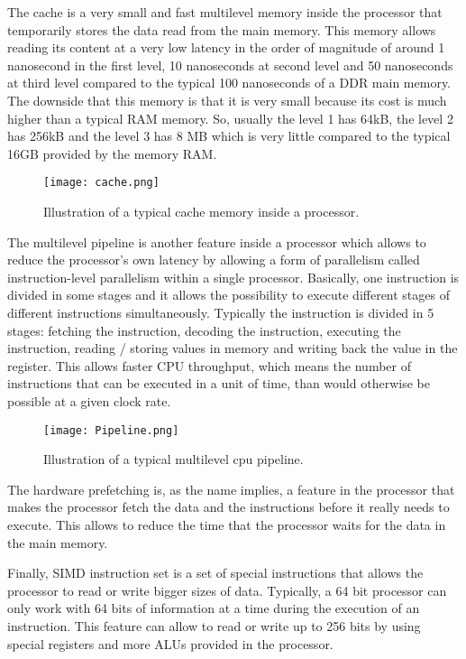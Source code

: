 \par
The cache is a very small and fast multilevel memory inside the processor that temporarily stores the data read from the main memory.
This memory allows reading its content at a very low latency in the order of magnitude of around 1 nanosecond in the first level, 10 nanoseconds at second level and 50 nanoseconds at third level compared to the typical 100 nanoseconds of a DDR main memory.
The downside that this memory is that  it is very small because its cost is much higher than a typical RAM memory.
So, usually the level 1 has 64kB, the level 2 has 256kB and the level 3 has 8 MB which is very little compared to the typical 16GB provided by the memory RAM.

\begin{figure}[H]
	\centering
	\caption{Illustration of a typical cache memory inside a processor.}
	\label{Cache.}
	\texttt{[image: cache.png]}
\end{figure}

\par
The multilevel pipeline is another feature inside a processor which allows to reduce the processor's own latency by allowing a form of parallelism called instruction-level parallelism within a single processor.
Basically, one instruction is divided in some stages and it allows the possibility to execute different stages of different instructions simultaneously.
Typically the instruction is divided in 5 stages: fetching the instruction, decoding the instruction, executing the instruction, reading / storing values in memory and writing back the value in the register.
This allows faster CPU throughput, which means the number of instructions that can be executed in a unit of time, than would otherwise be possible at a given clock rate.

\begin{figure}[H]
	\centering
	\caption{Illustration of a typical multilevel cpu pipeline.}
	\label{Pipeline.}
	\texttt{[image: Pipeline.png]}
\end{figure}

\par
The hardware prefetching is, as the name implies, a feature in the processor that makes the processor fetch the data and the instructions before it really needs to execute.
This allows to reduce the time that the processor waits for the data in the main memory.

\par
Finally, SIMD instruction set is a set of special instructions that allows the processor to read or write bigger sizes of data.
Typically, a 64 bit processor can only work with 64 bits of information at a time during the execution of an instruction.
This feature can allow to read or write up to 256 bits by using special registers and more ALUs provided in the processor.

